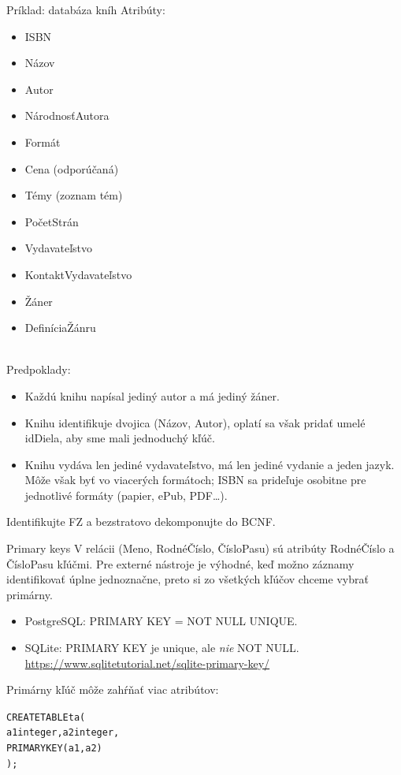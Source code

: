 \documentclass[12pt]{beamer}
\begin{document}
\begin{frame}[fragile]{Príklad: databáza kníh}
Atribúty:\\[3mm]
\begin{minipage}{.4\pdfpagewidth}
\scriptsize
\begin{itemize}
\item ISBN
\item Názov
\item Autor
\item NárodnosťAutora
\item Formát
\item Cena (odporúčaná)
\end{itemize}
\end{minipage}
\begin{minipage}{.4\pdfpagewidth}
\scriptsize
\begin{itemize}
\item Témy (zoznam tém)
\item PočetStrán
\item Vydavateľstvo
\item KontaktVydavateľstvo
\item Žáner
\item DefiníciaŽánru
\end{itemize}
\end{minipage}
\\[3mm]
Predpoklady:
{
\footnotesize
\begin{itemize}
\item Každú knihu napísal jediný autor a má jediný žáner.
\item Knihu identifikuje dvojica (Názov, Autor), oplatí sa však pridať umelé idDiela, aby sme mali jednoduchý kľúč.
\item Knihu vydáva len jediné vydavateľstvo, má len jediné vydanie a jeden jazyk.
    Môže však byť vo viacerých formátoch; ISBN sa prideľuje osobitne pre jednotlivé formáty (papier, ePub, PDF\dots).
\end{itemize}
}
Identifikujte FZ a bezstratovo dekomponujte do BCNF.
\end{frame}

\begin{frame}[fragile]{Primary keys}
V relácii (Meno, RodnéČíslo, ČísloPasu) sú atribúty RodnéČíslo a ČísloPasu kľúčmi.
Pre externé nástroje je výhodné, keď možno záznamy identifikovať úplne jednoznačne,
preto si zo všetkých kľúčov chceme vybrať primárny.
\begin{itemize}
\item PostgreSQL: \alert{PRIMARY KEY} = NOT NULL UNIQUE.
\item SQLite: PRIMARY KEY je unique, ale \emph{nie} NOT NULL.\\
      {\scriptsize \url{https://www.sqlitetutorial.net/sqlite-primary-key/}}
\end{itemize}

\bigskip
Primárny kľúč môže zahŕňať viac atribútov:
\begin{alltt}
CREATE TABLE ta (
  a1 integer, a2 integer,
  \alert{PRIMARY KEY (a1, a2)}
);
\end{alltt}
\end{frame}
\end{document}
